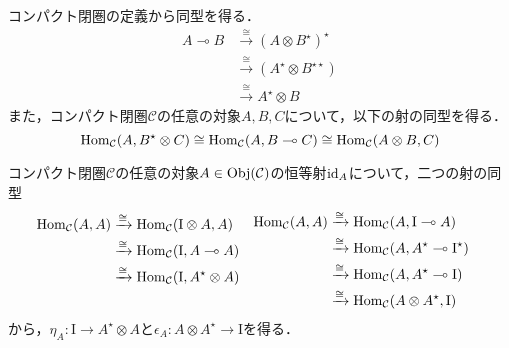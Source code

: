 \documentclass[type_judgement.tex]{subfiles}
\begin{document}
コンパクト閉圏の定義から同型を得る．
\begin{align*}
    A \multimap B &\xrightarrow{\cong} (A \otimes B^\star)^\star \\
    &\xrightarrow{\cong} (A^\star \otimes B^{\star\star}) \\
    &\xrightarrow{\cong} A^\star \otimes B
\end{align*}
また，コンパクト閉圏$\mathcal{C}$の任意の対象$A,B,C$について，以下の射の同型を得る．
\begin{equation*}
    \mathop{\mathrm{Hom}}\nolimits_\mathcal{C}(A, B^\star \otimes C) \cong \mathop{\mathrm{Hom}}\nolimits_\mathcal{C}(A, B \multimap C) \cong \mathop{\mathrm{Hom}}\nolimits_\mathcal{C}(A \otimes B, C)
\end{equation*}

コンパクト閉圏$\mathcal{C}$の任意の対象$A\in\mathop{\mathrm{Obj}}\nolimits(\mathcal{C})$の恒等射$\mathop{\mathrm{id}}\nolimits_A$について，二つの射の同型
\begin{align*}
&\begin{aligned}
    \mathop{\mathrm{Hom}}\nolimits_\mathcal{C}(A, A) &\xrightarrow{\cong} \mathop{\mathrm{Hom}}\nolimits_\mathcal{C}(\mathrm{I} \otimes A, A) \\
    &\xrightarrow{\cong} \mathop{\mathrm{Hom}}\nolimits_\mathcal{C}(\mathrm{I}, A \multimap A) \\
    &\xrightarrow{\cong} \mathop{\mathrm{Hom}}\nolimits_\mathcal{C}(\mathrm{I}, A^\star \otimes A) \\
    &
\end{aligned}
&
&\begin{aligned}
    \mathop{\mathrm{Hom}}\nolimits_\mathcal{C}(A, A) &\xrightarrow{\cong} \mathop{\mathrm{Hom}}\nolimits_\mathcal{C}(A, \mathrm{I} \multimap A) \\
    &\xrightarrow{\cong} \mathop{\mathrm{Hom}}\nolimits_\mathcal{C}(A, A^\star \multimap \mathrm{I}^\star) \\
    &\xrightarrow{\cong} \mathop{\mathrm{Hom}}\nolimits_\mathcal{C}(A, A^\star \multimap \mathrm{I}) \\
    &\xrightarrow{\cong} \mathop{\mathrm{Hom}}\nolimits_\mathcal{C}(A \otimes A^\star, \mathrm{I})
\end{aligned}
\end{align*}
から，$\eta_A:\mathrm{I} \rightarrow A^\star \otimes A$と$\epsilon_A:A \otimes A^\star \rightarrow \mathrm{I}$を得る．
\end{document}
